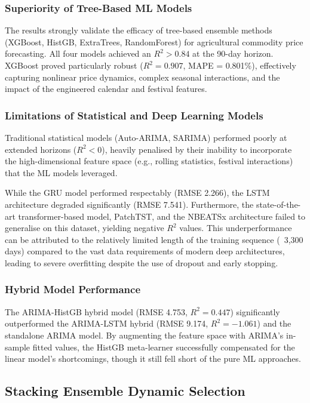 \subsubsection{Superiority of Tree-Based ML Models}
The results strongly validate the efficacy of tree-based ensemble methods (XGBoost, HistGB, ExtraTrees, RandomForest) for agricultural commodity price forecasting. All four models achieved an $R^2 > 0.84$ at the 90-day horizon. XGBoost proved particularly robust ($R^2 = 0.907$, MAPE = 0.801\%), effectively capturing nonlinear price dynamics, complex seasonal interactions, and the impact of the engineered calendar and festival features.

\subsubsection{Limitations of Statistical and Deep Learning Models}
Traditional statistical models (Auto-ARIMA, SARIMA) performed poorly at extended horizons ($R^2 < 0$), heavily penalised by their inability to incorporate the high-dimensional feature space (e.g., rolling statistics, festival interactions) that the ML models leveraged. 

While the GRU model performed respectably (RMSE 2.266), the LSTM architecture degraded significantly (RMSE 7.541). Furthermore, the state-of-the-art transformer-based model, PatchTST, and the NBEATSx architecture failed to generalise on this dataset, yielding negative $R^2$ values. This underperformance can be attributed to the relatively limited length of the training sequence (~3,300 days) compared to the vast data requirements of modern deep architectures, leading to severe overfitting despite the use of dropout and early stopping.

\subsubsection{Hybrid Model Performance}
The ARIMA-HistGB hybrid model (RMSE 4.753, $R^2 = 0.447$) significantly outperformed the ARIMA-LSTM hybrid (RMSE 9.174, $R^2 = -1.061$) and the standalone ARIMA model. By augmenting the feature space with ARIMA's in-sample fitted values, the HistGB meta-learner successfully compensated for the linear model's shortcomings, though it still fell short of the pure ML approaches.

\subsection{Stacking Ensemble Dynamic Selection}

